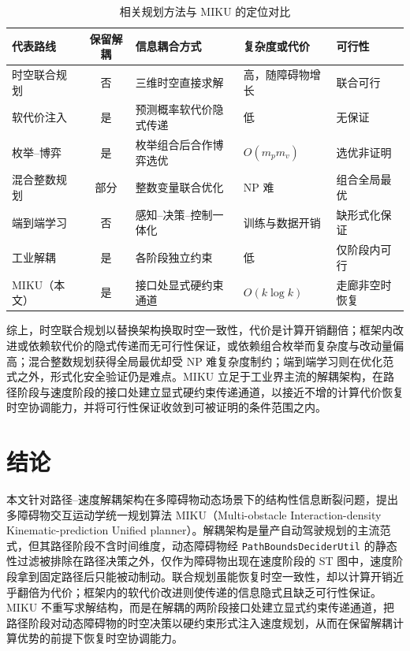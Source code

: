 \documentclass[a4paper,11pt]{ctexart}
\theoremstyle{definition}
\begin{document}
\begin{table}[t]
\centering
\footnotesize
\setlength{\tabcolsep}{4pt}
\caption{相关规划方法与 MIKU 的定位对比}
\label{tab:related}
\begin{tabular}{@{}lcp{3.0cm}p{2.6cm}p{2.8cm}@{}}
\toprule
代表路线 & 保留解耦 & 信息耦合方式 & 复杂度或代价 & 可行性 \\
\midrule
时空联合规划 & 否 & 三维时空直接求解 & 高，随障碍物增长 & 联合可行 \\
软代价注入 & 是 & 预测概率软代价隐式传递 & 低 & 无保证 \\
枚举--博弈 & 是 & 枚举组合后合作博弈选优 & $O(m_p m_v)$ & 选优非证明 \\
混合整数规划 & 部分 & 整数变量联合优化 & NP 难 & 组合全局最优 \\
端到端学习 & 否 & 感知--决策--控制一体化 & 训练与数据开销 & 缺形式化保证 \\
工业解耦 & 是 & 各阶段独立约束 & 低 & 仅阶段内可行 \\
MIKU（本文） & 是 & 接口处显式硬约束通道 & $O(k\log k)$ & 走廊非空时恢复 \\
\bottomrule
\end{tabular}
\end{table}

综上，时空联合规划以替换架构换取时空一致性，代价是计算开销翻倍；框架内改进或依赖软代价的隐式传递而无可行性保证，或依赖组合枚举而复杂度与改动量偏高；混合整数规划获得全局最优却受 NP 难复杂度制约；端到端学习则在优化范式之外，形式化安全验证仍是难点。MIKU 立足于工业界主流的解耦架构，在路径阶段与速度阶段的接口处建立显式硬约束传递通道，以接近不增的计算代价恢复时空协调能力，并将可行性保证收敛到可被证明的条件范围之内。

\section{结论}
\label{sec:conclusion}

本文针对路径--速度解耦架构在多障碍物动态场景下的结构性信息断裂问题，提出多障碍物交互运动学统一规划算法 MIKU（Multi-obstacle Interaction-density Kinematic-prediction Unified planner）。解耦架构是量产自动驾驶规划的主流范式，但其路径阶段不含时间维度，动态障碍物经 \texttt{PathBoundsDeciderUtil} 的静态性过滤被排除在路径决策之外，仅作为障碍物出现在速度阶段的 ST 图中，速度阶段拿到固定路径后只能被动制动。联合规划虽能恢复时空一致性，却以计算开销近乎翻倍为代价；框架内的软代价改进则使传递的信息隐式且缺乏可行性保证。MIKU 不重写求解结构，而是在解耦的两阶段接口处建立显式约束传递通道，把路径阶段对动态障碍物的时空决策以硬约束形式注入速度规划，从而在保留解耦计算优势的前提下恢复时空协调能力。
\end{document}
